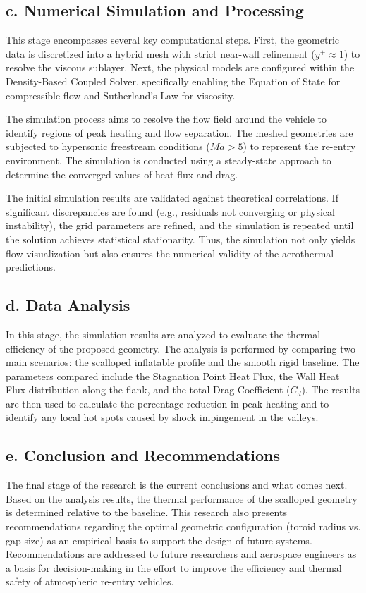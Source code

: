 \subsection*{c. Numerical Simulation and Processing}
This stage encompasses several key computational steps. First, the geometric data is discretized into a hybrid mesh with strict near-wall refinement ($y^+ \approx 1$) to resolve the viscous sublayer. Next, the physical models are configured within the Density-Based Coupled Solver, specifically enabling the Equation of State for compressible flow and Sutherland’s Law for viscosity.

The simulation process aims to resolve the flow field around the vehicle to identify regions of peak heating and flow separation. The meshed geometries are subjected to hypersonic freestream conditions ($Ma > 5$) to represent the re-entry environment. The simulation is conducted using a steady-state approach to determine the converged values of heat flux and drag.

The initial simulation results are validated against theoretical correlations. If significant discrepancies are found (e.g., residuals not converging or physical instability), the grid parameters are refined, and the simulation is repeated until the solution achieves statistical stationarity. Thus, the simulation not only yields flow visualization but also ensures the numerical validity of the aerothermal predictions.

\subsection*{d. Data Analysis}
In this stage, the simulation results are analyzed to evaluate the thermal efficiency of the proposed geometry. The analysis is performed by comparing two main scenarios: the scalloped inflatable profile and the smooth rigid baseline. The parameters compared include the Stagnation Point Heat Flux, the Wall Heat Flux distribution along the flank, and the total Drag Coefficient ($C_d$). The results are then used to calculate the percentage reduction in peak heating and to identify any local hot spots caused by shock impingement in the valleys.

\subsection*{e. Conclusion and Recommendations}
The final stage of the research is the current conclusions and what comes next. Based on the analysis results, the thermal performance of the scalloped geometry is determined relative to the baseline. This research also presents recommendations regarding the optimal geometric configuration (toroid radius vs. gap size) as an empirical basis to support the design of future   systems. Recommendations are addressed to future researchers and aerospace engineers as a basis for decision-making in the effort to improve the efficiency and thermal safety of atmospheric re-entry vehicles.


